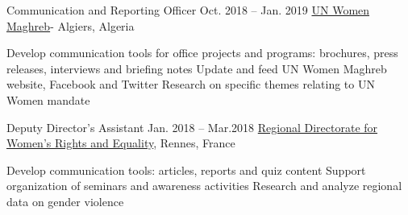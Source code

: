 \begin{joblist}[13.2][7.8][3.4]

\item[Communication and Reporting Officer]{Oct. 2018 -- Jan. 2019 }     
	{
	\href{http://maghreb.unwomen.org/fr}{UN Women Maghreb}- Algiers, Algeria
	}     
	{
			 
		\vspace{-0.5cm}
		\begin{itemize}
			  \iftbftiny \setlength\itemsep{-3pt} \fi
			  \cvitem[\checkmark] Develop communication tools for office projects and programs: brochures, press releases, interviews and briefing notes   
 			  \cvitem[\checkmark] Update and feed UN Women Maghreb website, Facebook and Twitter                                                       
			  \cvitem[\checkmark] Research on specific themes relating to UN Women mandate
		\end{itemize}      

	}

\item[Deputy Director's Assistant ]{Jan. 2018 -- Mar.2018 }     
  	{
	\href{https://www.egalite-femmes-hommes.gouv.fr/le-secretariat-d-etat/organisation-du-ministere/services-territoriaux/annuaire-des-equipes-regionales-et-departementales/}{Regional Directorate for Women's Rights and Equality}, Rennes, France
	}
  	{
        \vspace{-0.5cm}
		\iftbftiny \setlength{\parskip}{-10pt} \fi
		\begin{itemize}
			  \iftbftiny \setlength\itemsep{-3pt} \fi
			  \cvitem[\checkmark] Develop communication tools: articles, reports and quiz content
			  \cvitem[\checkmark] Support organization of seminars and awareness activities
			  \cvitem[\checkmark] Research and analyze regional data on gender violence
		\end{itemize}       
	}



\end{joblist}
